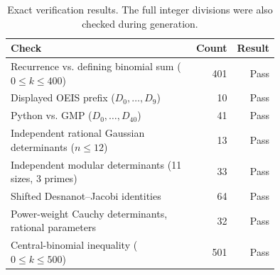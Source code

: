 \begin{table}[htbp]
\centering
\small
\begin{tabular}{p{0.75\linewidth}rr}
\toprule
Check & Count & Result \\
\midrule
Recurrence vs. defining binomial sum ($0\leq k\leq400$) & 401 & Pass \\
Displayed OEIS prefix ($D_0,\ldots,D_9$) & 10 & Pass \\
Python vs. GMP ($D_0,\ldots,D_{40}$) & 41 & Pass \\
Independent rational Gaussian determinants ($n\leq12$) & 13 & Pass \\
Independent modular determinants (11 sizes, 3 primes) & 33 & Pass \\
Shifted Desnanot--Jacobi identities & 64 & Pass \\
Power-weight Cauchy determinants, rational parameters & 32 & Pass \\
Central-binomial inequality ($0\leq k\leq500$) & 501 & Pass \\
\bottomrule
\end{tabular}
\caption{Exact verification results. The full integer divisions were also checked during generation.}\label{tab:verification}
\end{table}
